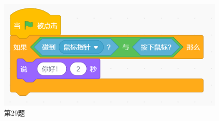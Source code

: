 \documentclass[10pt, a4paper]{article}
\begin{document}
\begin{enumerate}
        \begin{figure}[htbp]
            \centering
            \begin{minipage}[t]{.25\textwidth}
                \centering
                \includegraphics[width=\textwidth]{29.png}
                \caption*{第29题}
            \end{minipage}
            \begin{minipage}[t]{.12\textwidth}
                \centering

\end{minipage}
\end{figure}
\end{enumerate}
\end{document}
